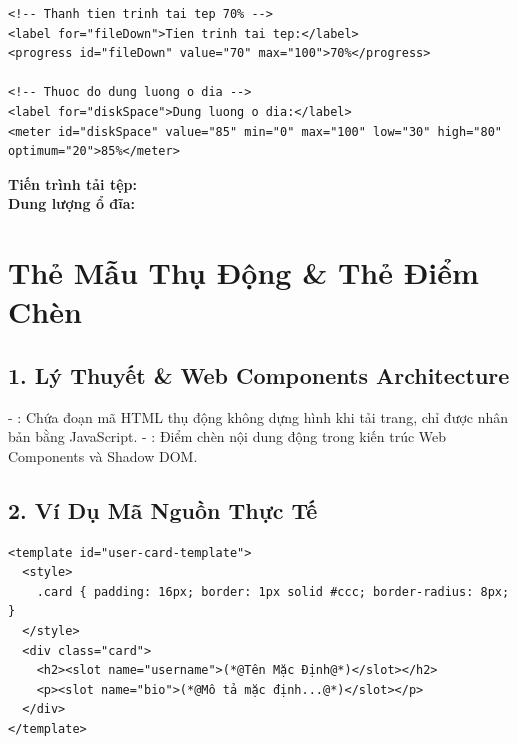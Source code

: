 \begin{codeWindow}
\begin{lstlisting}[language=HTML5]
<!-- Thanh tien trinh tai tep 70% -->
<label for="fileDown">Tien trinh tai tep:</label>
<progress id="fileDown" value="70" max="100">70%</progress>

<!-- Thuoc do dung luong o dia -->
<label for="diskSpace">Dung luong o dia:</label>
<meter id="diskSpace" value="85" min="0" max="100" low="30" high="80" optimum="20">85%</meter>
\end{lstlisting}
\end{codeWindow}

\begin{browserWindow}
\sffamily\small
\textbf{Tiến trình tải tệp:} \;\;
 \\[6pt]
\textbf{Dung lượng ổ đĩa:} \;\;
\end{browserWindow}

\section{Thẻ Mẫu Thụ Động  \& Thẻ Điểm Chèn }
\subsection{1. Lý Thuyết \& Web Components Architecture}
- : Chứa đoạn mã HTML thụ động không dựng hình khi tải trang, chỉ được nhân bản bằng JavaScript.
- : Điểm chèn nội dung động trong kiến trúc Web Components và Shadow DOM.

\subsection{2. Ví Dụ Mã Nguồn Thực Tế}
\begin{lstlisting}[language=HTML5, caption={Ví dụ định nghĩa thẻ template và named slot}]
<template id="user-card-template">
  <style>
    .card { padding: 16px; border: 1px solid #ccc; border-radius: 8px; }
  </style>
  <div class="card">
    <h2><slot name="username">(*@Tên Mặc Định@*)</slot></h2>
    <p><slot name="bio">(*@Mô tả mặc định...@*)</slot></p>
  </div>
</template>
\end{lstlisting}

